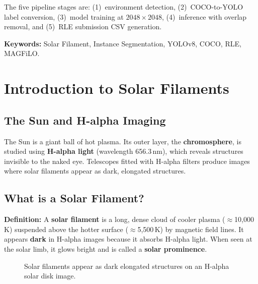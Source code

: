 \documentclass[12pt,a4paper,openany]{report}
\begin{document}
The five pipeline stages are: (1)~environment detection, (2)~COCO-to-YOLO label conversion,
(3)~model training at $2048\times2048$, (4)~inference with overlap removal, and
(5)~RLE submission CSV generation.

\vspace{0.4cm}
\noindent\textbf{Keywords:} Solar Filament, Instance Segmentation, YOLOv8, COCO, RLE, MAGFiLO.

\tableofcontents
\listoffigures
\listoftables

\chapter{Introduction to Solar Filaments}

\section{The Sun and H-alpha Imaging}

The Sun is a giant ball of hot plasma. Its outer layer, the \textbf{chromosphere}, is studied
using \textbf{H-alpha light} (wavelength 656.3\,nm), which reveals structures invisible to
the naked eye. Telescopes fitted with H-alpha filters produce images where solar filaments
appear as dark, elongated structures.

\section{What is a Solar Filament?}

\begin{defbox}
\textbf{Definition:} A \textbf{solar filament} is a long, dense cloud of cooler plasma
($\approx$10{,}000\,K) suspended above the hotter surface ($\approx$5{,}500\,K) by magnetic
field lines. It appears \textbf{dark} in H-alpha images because it absorbs H-alpha light.
When seen at the solar limb, it glows bright and is called a \textbf{solar prominence}.
\end{defbox}

\begin{figure}[H]
\centering
{}
\caption{Solar filaments appear as dark elongated structures on an H-alpha solar disk image.}
\label{fig:halpha}
\end{figure}
\end{document}
